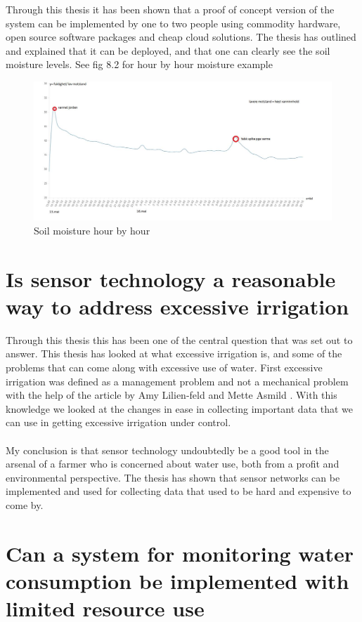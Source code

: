 \documentclass[]{uiophd}
\begin{document}
Through this thesis it has been shown that a proof of concept version of the system can be implemented by one to two people using commodity hardware, open source software packages and cheap cloud solutions. The thesis has outlined and explained that it can be deployed, and that one can clearly see the soil moisture levels. See fig 8.2 for hour by hour moisture example
 \begin{figure}[h]
\caption{Soil moisture hour by hour}
\centering
\includegraphics[width=14cm]{warter_hourbyhour.png}
\end{figure}


\section{ Is sensor technology a reasonable way to address excessive irrigation}

Through this thesis this has been one of the central question that was set out to answer. This thesis has looked at what excessive irrigation is, and some of the problems that can come along with excessive use of water. First excessive irrigation was defined as a management problem and not a mechanical problem with the help of the article by Amy Lilien-feld and Mette Asmild \cite{LILIENFELD200773}. With this knowledge we looked at the changes in ease in collecting important data that we can use in getting excessive irrigation under control. 
\\\\
My conclusion is that sensor technology undoubtedly be a good tool in the arsenal of a farmer who is concerned about water use, both from a profit and environmental perspective. The thesis has shown that sensor networks can be implemented and used for collecting data that used to be hard and expensive to come by.

\section{ Can a system for monitoring water consumption be implemented with limited resource use}
\end{document}
